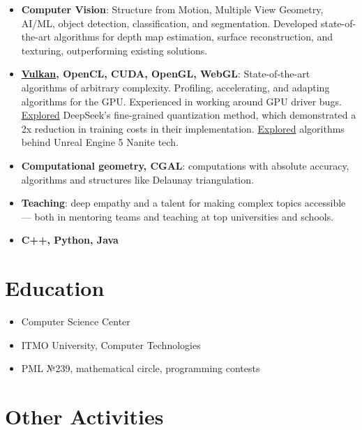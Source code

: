 \documentclass[11pt,oneside]{article}
\newcommand{\hhref}[2]{\href{#1}{\color{blue}#2}}
\begin{document}
\begin{itemize}
    \item{\textbf{Computer Vision}}: Structure from Motion, Multiple View Geometry, AI/ML, object detection, classification, and segmentation. Developed state-of-the-art algorithms for depth map estimation, surface reconstruction, and texturing, outperforming existing solutions.
    \item{\textbf{\hhref{https://github.com/GPGPUCourse/GPGPUVulkan}{Vulkan}, OpenCL, CUDA, OpenGL, WebGL}}: State-of-the-art algorithms of arbitrary complexity. Profiling, accelerating, and adapting algorithms for the GPU. Experienced in working around GPU driver bugs. \hhref{https://youtu.be/zJ6ru8dNAcs?t=5698}{Explored} DeepSeek’s fine-grained quantization method, which demonstrated a 2x reduction in training costs in their implementation.
\hhref{https://www.youtube.com/watch?v=ltUzX1IR9JI&list=PL5p-5hHpsHBolSeDn7__1c9hgPprYTjnn&index=3}{Explored} algorithms behind Unreal Engine 5 Nanite tech.

    \item{\textbf{Computational geometry, CGAL}}: computations with absolute accuracy, algorithms and structures like Delaunay triangulation.

    \item{\textbf{Teaching}}: deep empathy and a talent for making complex topics accessible — both in mentoring teams and teaching at top universities and schools.

    \item{\textbf{C++, Python, Java}}
\end{itemize}

\vspace{-9pt}
\section*{\textbf{Education}}
\vspace{-9pt}

\begin{itemize}
    \item{Computer Science Center}
    \item{ITMO University, Computer Technologies}
    \item{PML №239, mathematical circle, programming contests}
\end{itemize}


\vspace{-9pt}
\section*{\textbf{Other Activities}}
\vspace{-9pt}
\end{document}
